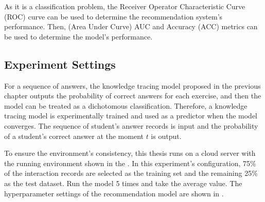 As it is a classification problem, the Receiver Operator Characteristic Curve (ROC) curve can be used to determine the recommendation system's performance. Then, (Area Under Curve) AUC and Accuracy (ACC) metrics can be used to determine the model's performance.


\subsection{Experiment Settings}
For a sequence of answers, the knowledge tracing model proposed in the previous chapter outputs the probability of correct answers for each exercise, and then the model can be treated as a dichotomous classification. Therefore, a knowledge tracing model is experimentally trained and used as a predictor when the model converges. The sequence of student's answer records is input and the probability of a student's correct answer at the moment \(t\) is output.



To ensure the environment's consistency, this thesis runs on a cloud server with the running environment shown in the \tblname{\ref{tbl:ch4-exp-env}}. In this experiment's configuration, 75\% of the interaction records are selected as the training set and the remaining 25\% as the test dataset. Run the model 5 times and take the average value. The hyperparameter settings of the recommendation model are shown in \tblname{\ref{tbl:ch4-hpsetting}}.

